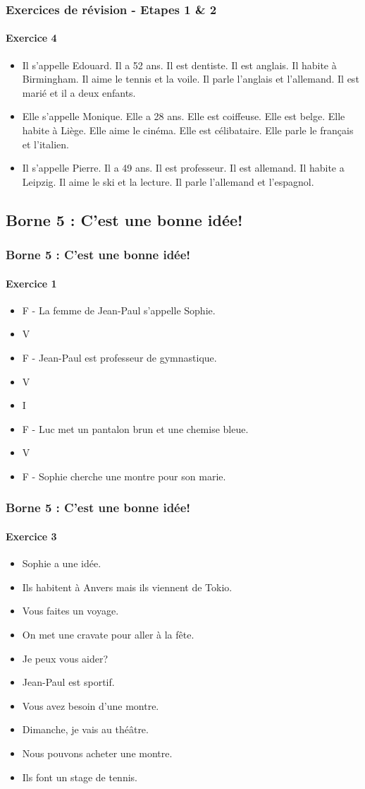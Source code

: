 \documentclass{beamer}
\begin{document}
\frame
{
  \frametitle{Exercices de révision - Etapes 1 \& 2}

  \framesubtitle{Exercice 4}
  
  \begin{itemize}
    \item Il s'appelle Edouard. Il a 52 ans. Il est dentiste. Il est anglais.
      Il habite à Birmingham. Il aime le tennis et la voile.
      Il parle l'anglais et l'allemand. Il est marié et il a deux enfants.
    \item Elle s'appelle Monique. Elle a 28 ans. Elle est coiffeuse.
      Elle est belge. Elle habite à Liège. Elle aime le cinéma.
      Elle est célibataire. Elle parle le français et l'italien.
    \item Il s'appelle Pierre. Il a 49 ans. Il est professeur. Il est allemand.
      Il habite a Leipzig. Il aime le ski et la lecture.
      Il parle l'allemand et l'espagnol.
  \end{itemize}
}

\subsection{Borne 5 : C'est une bonne idée!}

\frame
{
  \frametitle{Borne 5 : C'est une bonne idée!}

  \framesubtitle{Exercice 1}
  
  \begin{itemize}
    \item F - La femme de Jean-Paul s'appelle Sophie.
    \item V
    \item F - Jean-Paul est professeur de gymnastique.
    \item V
    \item I
    \item F - Luc met un pantalon brun et une chemise bleue.
    \item V
    \item F - Sophie cherche une montre pour son marie.
  \end{itemize}
}

\frame
{
  \frametitle{Borne 5 : C'est une bonne idée!}

  \framesubtitle{Exercice 3}
  
  \begin{itemize}
    \item Sophie a une idée.
    \item Ils habitent à Anvers mais ils viennent de Tokio.
    \item Vous faites un voyage.
    \item On met une cravate pour aller à la fête.
    \item Je peux vous aider?
    \item Jean-Paul est sportif.
    \item Vous avez besoin d'une montre.
    \item Dimanche, je vais au théâtre.
    \item Nous pouvons acheter une montre.
    \item Ils font un stage de tennis.
  \end{itemize}
}
\end{document}
